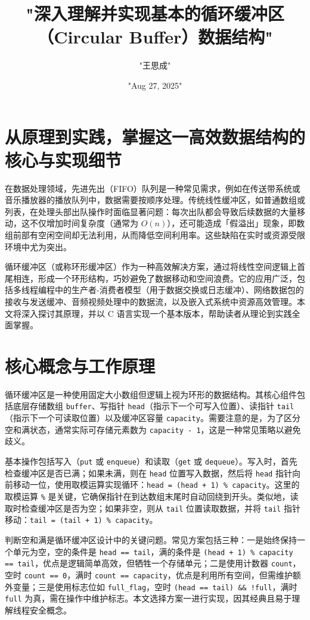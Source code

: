 \title{"深入理解并实现基本的循环缓冲区（Circular Buffer）数据结构"}
\author{"王思成"}
\date{"Aug 27, 2025"}
\maketitle
\chapter{从原理到实践，掌握这一高效数据结构的核心与实现细节}
在数据处理领域，先进先出（FIFO）队列是一种常见需求，例如在传送带系统或音乐播放器的播放队列中，数据需要按顺序处理。传统线性缓冲区，如普通数组或列表，在处理头部出队操作时面临显著问题：每次出队都会导致后续数据的大量移动，这不仅增加时间复杂度（通常为 $O(n)$），还可能造成「假溢出」现象，即数组前部有空闲空间却无法利用，从而降低空间利用率。这些缺陷在实时或资源受限环境中尤为突出。\par
循环缓冲区（或称环形缓冲区）作为一种高效解决方案，通过将线性空间逻辑上首尾相连，形成一个环形结构，巧妙避免了数据移动和空间浪费。它的应用广泛，包括多线程编程中的生产者-消费者模型（用于数据交换或日志缓冲）、网络数据包的接收与发送缓冲、音频视频处理中的数据流，以及嵌入式系统中资源高效管理。本文将深入探讨其原理，并以 C 语言实现一个基本版本，帮助读者从理论到实践全面掌握。\par
\chapter{核心概念与工作原理}
循环缓冲区是一种使用固定大小数组但逻辑上视为环形的数据结构。其核心组件包括底层存储数组 \texttt{buffer}、写指针 \texttt{head}（指示下一个可写入位置）、读指针 \texttt{tail}（指示下一个可读取位置）以及缓冲区容量 \texttt{capacity}。需要注意的是，为了区分空和满状态，通常实际可存储元素数为 \texttt{capacity - 1}，这是一种常见策略以避免歧义。\par
基本操作包括写入（\texttt{put} 或 \texttt{enqueue}）和读取（\texttt{get} 或 \texttt{dequeue}）。写入时，首先检查缓冲区是否已满；如果未满，则在 \texttt{head} 位置写入数据，然后将 \texttt{head} 指针向前移动一位，使用取模运算实现循环：\texttt{head = (head + 1) \%{} capacity}。这里的取模运算 \texttt{\%{}} 是关键，它确保指针在到达数组末尾时自动回绕到开头。类似地，读取时检查缓冲区是否为空；如果非空，则从 \texttt{tail} 位置读取数据，并将 \texttt{tail} 指针移动：\texttt{tail = (tail + 1) \%{} capacity}。\par
判断空和满是循环缓冲区设计中的关键问题。常见方案包括三种：一是始终保持一个单元为空，空的条件是 \texttt{head == tail}，满的条件是 \texttt{(head + 1) \%{} capacity == tail}，优点是逻辑简单高效，但牺牲一个存储单元；二是使用计数器 \texttt{count}，空时 \texttt{count == 0}，满时 \texttt{count == capacity}，优点是利用所有空间，但需维护额外变量；三是使用标志位如 \texttt{full\_{}flag}，空时 \texttt{(head == tail) \&{}\&{} !full}，满时 \texttt{full} 为真，需在操作中维护标志。本文选择方案一进行实现，因其经典且易于理解线程安全概念。\par
